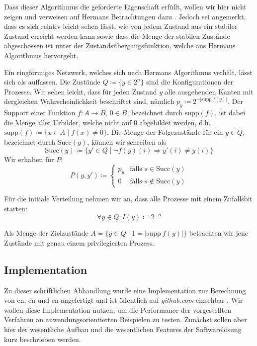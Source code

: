 \documentclass[a4paper]{article}
\theoremstyle{nonumberplain}
\begin{document}
Dass dieser Algorithmus die geforderte Eigenschaft erfüllt, wollen wir hier nicht zeigen und verweisen auf Hermans Betrachtungen dazu \cite{Her90}. Jedoch sei angemerkt, dass es sich relativ leicht sehen lässt, wie von jedem Zustand aus ein stabiler Zustand erreicht werden kann sowie dass die Menge der stabilen Zustände abgeschossen ist unter der Zustandsübergangsfunktion, welche aus Hermans Algorithmus hervorgeht.


Ein ringförmiges Netzwerk, welches sich nach Hermans Algorithmus verhält, lässt sich als \mc{} \mcex{} auffassen. Die Zustände $Q \coloneqq \{ y \in 2^n\}$ sind die Konfigurationen der Prozesse. Wir sehen leicht, dass für jeden Zustand $y$ alle ausgehenden Kanten mit dergleichen Wahrscheinlichkeit beschriftet sind, nämlich $p_y \coloneqq 2^{-|\mathrm{supp}\>f(y)|}$. Der Support einer Funktion $f : A \to B$, $0\in B$, bezeichnet durch $\mathrm{supp}(f)$, ist dabei die Menge aller Urbilder, welche nicht auf $0$ abgebildet werden, d.h. $\mathrm{supp}(f)\coloneqq\{x \in A \mid f(x) \neq 0\}$. Die Menge der Folgezustände für ein $y \in Q$, bezeichnet durch $\mathrm{Succ}(y)$, können wir schreiben als
\[
	\mathrm{Succ}(y) \coloneqq \{ y' \in Q \mid \neg f(y)(i) \Rightarrow y'(i) \neq y(i) \}
\]
Wir erhalten für $P$:
\begin{equation}
	P(y,y') \coloneqq \begin{cases}
		p_y & \text{falls } s\in \mathrm{Succ}(y)\\
		0 & \text{falls } s\notin \mathrm{Succ}(y)
	\end{cases}
\end{equation}

Für die initiale Verteilung nehmen wir an, dass alle Prozesse mit einem Zufallsbit starten:
\begin{equation*}
	\forall y \in Q : I(y) \coloneqq 2^{-n}
\end{equation*}

Als Menge der Zielzustände  $A = \{ y \in Q \mid 1 = |\mathrm{supp}\>f(y)|\}$ betrachten wir jene Zustände mit genau einem privilegierten Prozess.

\subsection{Implementation}

Zu dieser schriftlichen Abhandlung wurde eine Implementation zur Berechnung von \expect{}en, \var{}en und \cov{}en angefertigt und ist öffentlich auf \textit{github.com} einsehbar \cite{MCA}. Wir wollen diese Implementation nutzen, um die Performance der vorgestellten Verfahren an anwendungsorientierten Beispielen zu testen. Zunächst sollen aber hier der wesentliche Aufbau und die wesentlichen Features der Softwarelösung kurz beschrieben werden.
\end{document}
